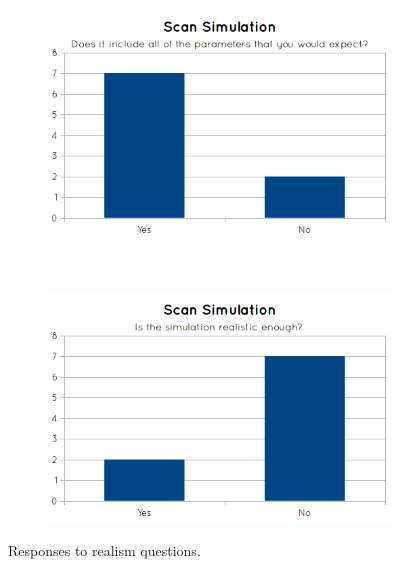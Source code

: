 \begin{figure}[H]
  \centering
  \begin{subfigure}[b]{0.5\textwidth}
    \includegraphics[width=\textwidth]{images/evaluation/graph_scan_simulation_2.png}
  \end{subfigure}%
  ~ %
  \begin{subfigure}[b]{0.5\textwidth}
    \includegraphics[width=\textwidth]{images/evaluation/graph_scan_simulation_3.png}
  \end{subfigure}
  \caption{Responses to realism questions.}\label{fig:graph_scan_simulation23}
\end{figure}

